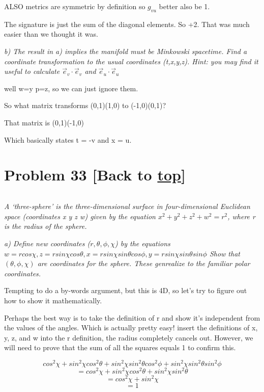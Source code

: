 \documentclass[landscape,letterpaper,10pt,english]{article}
\begin{document}
ALSO metrics are symmetric by definition so \(g_{vu}\) better also be 1.

The signature is just the sum of the diagonal elements. So +2. That was
much easier than we thought it was.

    \emph{b) The result in a) implies the manifold must be Minkowski
spacetime. Find a coordinate transformation to the usual coordinates
(t,x,y,z). Hint: you may find it useful to calculate
\(\vec e_v \cdot \vec e_v\) and \(\vec e_u \cdot \vec e_u\)}

    well w=y p=z, so we can just ignore them.

So what matrix transforms (0,1)(1,0) to (-1,0)(0,1)?

That matrix is (0,1)(-1,0)

Which basically states t = -v and x = u.

    \hypertarget{problem-33-back-to-top}{%
\section{\texorpdfstring{Problem 33 {[}Back to
\hyperref[toc]{top}{]}}{Problem 33 {[}Back to {]}}}\label{problem-33-back-to-top}}

\[\label{P33}\]

\emph{A `three-sphere' is the three-dimensional surface in
four-dimensional Euclidean space (coordinates x y z w) given by the
equation \(x^2+y^2+z^2+w^2 = r^2\), where r is the radius of the
sphere.}

\emph{a) Define new coordinates (\(r,\theta,\phi,\chi\)) by the
equations
\(w=rcos\chi, z=rsin\chi cos\theta, x=rsin\chi sin\theta cos\phi, y = rsin\chi sin\theta sin\phi\)
Show that \((\theta,\phi,\chi)\) are coordinates for the sphere. These
genrealize to the familiar polar coordinates.}

    Tempting to do a by-words argument, but this is 4D, so let's try to
figure out how to show it mathematically.

Perhaps the best way is to take the definition of r and show it's
independent from the values of the angles. Which is actually pretty
easy! insert the definitions of x, y, z, and w into the r definition,
the radius completely cancels out. However, we will need to prove that
the sum of all the squares equals 1 to confirm this.

\[ cos^2\chi + sin^2\chi cos^2\theta + sin^2\chi sin^2\theta cos^2\phi + sin^2\chi sin^2\theta sin^2\phi\]
\[ = cos^2\chi + sin^2\chi cos^2\theta + sin^2\chi sin^2\theta\]
\[ = cos^2\chi + sin^2\chi\] \[ = 1\]
\end{document}
